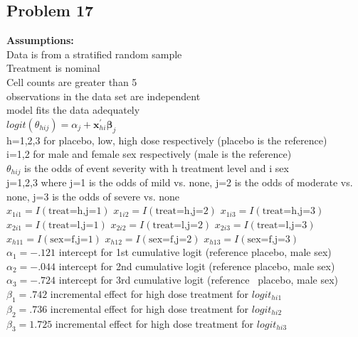 \documentclass{article}
\begin{document}
\begin{flushleft}
\section*{Problem 17}
\textbf{Assumptions:}\\
Data is from a stratified random sample\\
Treatment is nominal\\
Cell counts are greater than 5\\
observations in the data set are independent\\
model fits the data adequately\\

$logit(\theta_{hij})=\alpha_j+\boldsymbol{x}^{\prime}_{hi}\boldsymbol{\beta}_j$\\
h=1,2,3 for placebo, low, high dose respectively (placebo is the reference)\\
i=1,2 for male and female sex respectively (male is the reference)\\
$\theta_{hij}$ is the odds of event severity with h treatment level and i sex\\
j=1,2,3 where j=1 is the odds of mild vs. none, j=2 is the odds of moderate vs.
none, j=3 is the odds of severe vs. none\\
$x_{1i1}=I(\text{treat=h,j=1})$ \quad $x_{1i2}=I(\text{treat=h,j=2})$ \quad $x_{1i3}=I(\text{treat=h,j=3})$\\
$x_{2i1}=I(\text{treat=l,j=1})$ \quad $x_{2i2}=I(\text{treat=l,j=2})$ \quad $x_{2i3}=I(\text{treat=l,j=3})$\\
$x_{h11}=I(\text{sex=f,j=1})$ \quad $x_{h12}=I(\text{sex=f,j=2})$ \quad $x_{h13}=I(\text{sex=f,j=3})$\\
$\alpha_1=-.121$ intercept for 1st cumulative logit (reference placebo, male sex)\\

$\alpha_2=-.044$ intercept for 2nd cumulative logit (reference placebo, male sex)\\

$\alpha_3=-.724$ intercept for 3rd cumulative logit (reference \ placebo, male sex)\\

$\beta_1=.742$ incremental effect for high dose treatment for $logit_{hi1}$ \\

$\beta_2=.736$ incremental effect for high dose treatment for $logit_{hi2}$\\

$\beta_3=1.725$ incremental effect for high dose treatment for $logit_{hi3}$\\


\end{flushleft}
\end{document}
